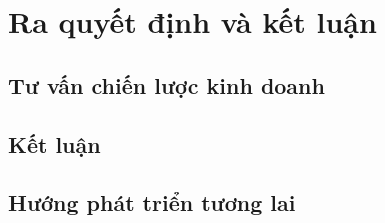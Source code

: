 \clearpage
\section{Ra quyết định và kết luận}
\subsection{Tư vấn chiến lược kinh doanh}

\subsection{Kết luận}

\subsection{Hướng phát triển tương lai}
